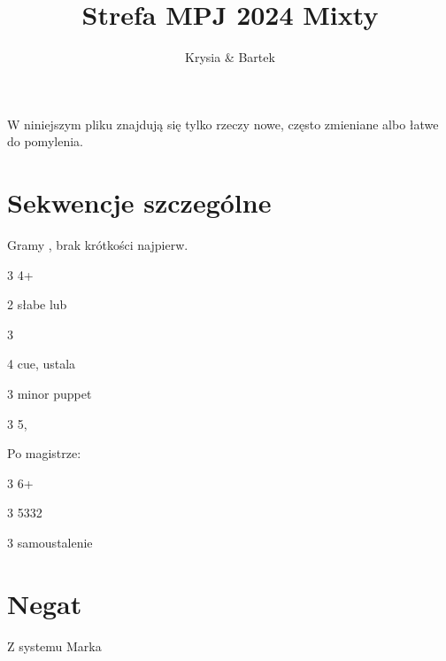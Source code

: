 \documentclass[12pt, a4paper]{report}
\title{\spades\clubs Strefa MPJ 2024 Mixty \xdiams\xhearts}
\author{Krysia \& Bartek}
\begin{document}
\maketitle

\tableofcontents

W niniejszym pliku znajdują się tylko rzeczy nowe, często zmieniane albo łatwe do pomylenia.

\section{Sekwencje szczególne}

Gramy \lsf, brak krótkości najpierw.

\sequence{{1\diams}{1\spades}{2\diams}{2\hearts}}
\begin{options}[1]
    \item[3\clubs] 4+\hearts
\end{options}

\sequence{{1\ntx}}
\begin{options}[2]
    \item[2\nt] słabe \minor lub \diams
    \item[3\diams] \diams\ \inv
\end{options}

\sequence{{2\ntx}{3\diams}{3\hearts}}
\begin{options}[2]
    \item[4\minor] cue, ustala \hearts
    \item[3\spades] \nt \then minor puppet
    \item[3\nt] 5\spades, \fonce
\end{options}

Po magistrze:
\begin{options}[2]
    \item[3\major] 6+ \inv
    \item[3\nt] 5332
\end{options}

\begin{options}[2]
    \item[3\major] samoustalenie \gf
\end{options}

\section{Negat}
Z systemu Marka
\end{document}
